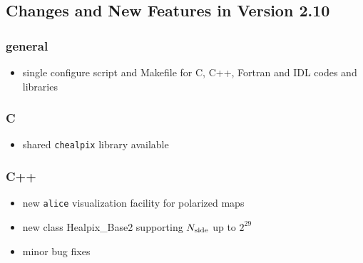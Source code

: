\documentclass[12pt,twoside]{article}
\newcommand{\nside}{{N_{\rm side}}}
\begin{document}
{{\subsection{Changes and New Features in Version 2.10}
\subsubsection[New General Features]{general}
  \begin{itemize}
    \item single configure script and Makefile for C, C++, Fortran and IDL codes and libraries
  \end{itemize}
\subsubsection[New Features: C]{C}
  \begin{itemize}
    \item shared {\tt chealpix} library available
  \end{itemize}
\subsubsection[New Features: C++]{C++}
  \begin{itemize}
    \item new {\tt alice} visualization facility for polarized maps
    \item new class Healpix\_Base2 supporting $\nside$ up to $2^{29}$
    \item minor bug fixes
  \end{itemize}
}}
\end{document}
